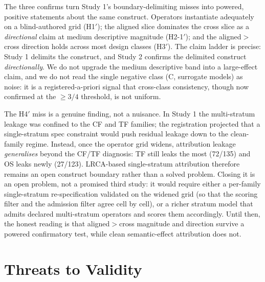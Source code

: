 \documentclass[manuscript,screen,review]{acmart}
\begin{document}
The three confirms turn Study 1's boundary-delimiting misses into
powered, positive statements about the same construct. Operators
instantiate adequately on a blind-authored grid (H1\('\)); the aligned
slice dominates the cross slice as a \emph{directional} claim at medium
descriptive magnitude (H2-1\('\)); and the aligned\(>\)cross direction
holds across most design classes (H3\('\)). The claim ladder is precise:
Study 1 delimits the construct, and Study 2 confirms the delimited
construct \emph{directionally}. We do not upgrade the medium descriptive
band into a large-effect claim, and we do not read the single negative
class (C, surrogate models) as noise: it is a registered-a-priori signal
that cross-class consistency, though now confirmed at the \(\geq 3/4\)
threshold, is not uniform.

The H4\('\) miss is a genuine finding, not a nuisance. In Study 1 the
multi-stratum leakage was confined to the CF and TF families; the
registration projected that a single-stratum spec constraint would push
residual leakage down to the clean-family regime. Instead, once the
operator grid widens, attribution leakage \emph{generalises} beyond the
CF/TF diagnosis: TF still leaks the most (72/135) and OS leaks newly
(27/123). LRCA-based single-stratum attribution therefore remains an
open construct boundary rather than a solved problem. Closing it is an
open problem, not a promised third study: it would require either a
per-family single-stratum re-specification validated on the widened grid
(so that the scoring filter and the admission filter agree cell by cell),
or a richer stratum model that admits declared multi-stratum operators
and scores them accordingly. Until then, the honest reading is that
aligned\(>\)cross magnitude and direction survive a powered confirmatory
test, while clean semantic-effect attribution does not.

\section{Threats to Validity}\label{threats-to-validity}
\end{document}
